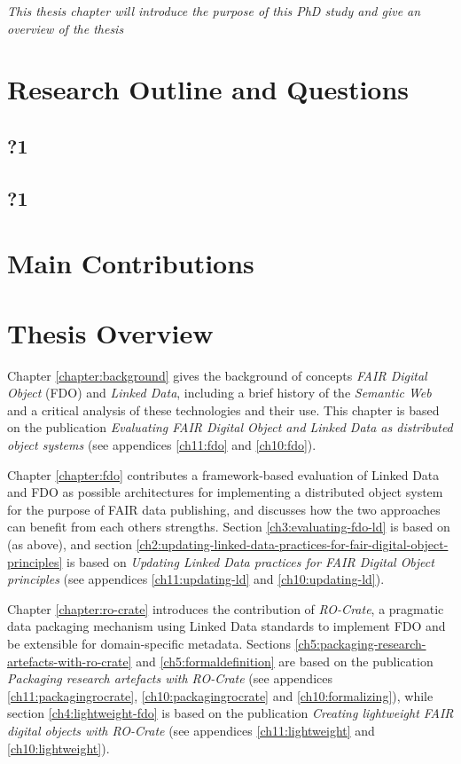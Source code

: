\emph{This thesis chapter will introduce the purpose of this PhD
study and give an overview of the
thesis}

\section{Research Outline and Questions}
\subsection{?1}
\subsection{?1}
\section{Main Contributions}

\section{Thesis Overview}

Chapter \vref{chapter:background} gives the background of concepts \emph{FAIR Digital Object} (FDO) and \emph{Linked Data}, including a brief history of the \emph{Semantic Web} and a critical analysis of these technologies and their use. 
This chapter is based on the publication \emph{Evaluating FAIR Digital Object and Linked Data as distributed object systems} \cite{soilandreyes2023c}  (see appendices \vref{ch11:fdo} and \vref{ch10:fdo}).

Chapter \vref{chapter:fdo} contributes a framework-based evaluation of Linked Data and FDO as possible architectures for implementing a distributed object system for the purpose of FAIR data publishing, and discusses how the two approaches can benefit from each others strengths. 
Section \vref{ch3:evaluating-fdo-ld} is based on \cite{soilandreyes2023c} (as above), and section \vref{ch2:updating-linked-data-practices-for-fair-digital-object-principles} is based on \emph{Updating Linked Data practices for FAIR Digital Object principles} \cite{10.3897/rio.8.e94501} (see appendices \ref{ch11:updating-ld} and \ref{ch10:updating-ld}).

Chapter \vref{chapter:ro-crate} introduces the contribution of \emph{RO-Crate}, a pragmatic data packaging mechanism using Linked Data standards to implement FDO and be extensible for domain-specific metadata.  
Sections \vref{ch5:packaging-research-artefacts-with-ro-crate} and \vref{ch5:formaldefinition} are based on the publication \emph{Packaging research artefacts with RO-Crate} \cite{Soiland-Reyes 2022} (see appendices \ref{ch11:packagingrocrate}, \ref{ch10:packagingrocrate} and \ref{ch10:formalizing}), while section \vref{ch4:lightweight-fdo} is based on the publication \emph{Creating lightweight FAIR digital objects with RO-Crate} \cite{10.3897/rio.8.e93937} (see appendices \ref{ch11:lightweight} and \ref{ch10:lightweight}).

